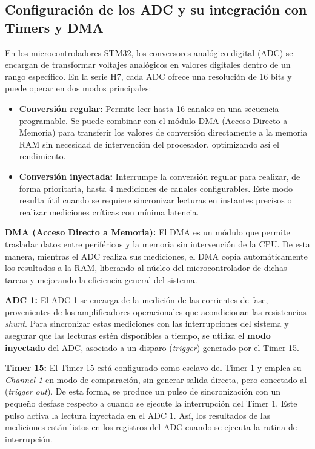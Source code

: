 \documentclass[11pt]{report}
\begin{document}
\subsection{Configuración de los ADC y su integración con Timers y DMA} En los microcontroladores STM32, los conversores analógico-digital (ADC) se encargan de transformar voltajes analógicos en valores digitales dentro de un rango específico. En la serie H7, cada ADC ofrece una resolución de 16 bits y puede operar en dos modos principales:

\begin{itemize}
	\item \textbf{Conversión regular:} Permite leer hasta 16 canales en una secuencia programable. Se puede combinar con el módulo DMA (Acceso Directo a Memoria) para transferir los valores de conversión directamente a la memoria RAM sin necesidad de intervención del procesador, optimizando así el rendimiento.
	\item \textbf{Conversión inyectada:} Interrumpe la conversión regular para realizar, de forma prioritaria, hasta 4 mediciones de canales configurables. Este modo resulta útil cuando se requiere sincronizar lecturas en instantes precisos o realizar mediciones críticas con mínima latencia.
\end{itemize}

\textbf{DMA (Acceso Directo a Memoria):} El DMA es un módulo que permite trasladar datos entre periféricos y la memoria sin intervención de la CPU. De esta manera, mientras el ADC realiza sus mediciones, el DMA copia automáticamente los resultados a la RAM, liberando al núcleo del microcontrolador de dichas tareas y mejorando la eficiencia general del sistema.

\textbf{ADC 1:} El ADC 1 se encarga de la medición de las corrientes de fase, provenientes de los amplificadores operacionales que acondicionan las resistencias \emph{shunt}. Para sincronizar estas mediciones con las interrupciones del sistema y asegurar que las lecturas estén disponibles a tiempo, se utiliza el \textbf{modo inyectado} del ADC, asociado a un disparo (\emph{trigger}) generado por el Timer 15.

\textbf{Timer 15:} El Timer 15 está configurado como esclavo del Timer 1 y emplea su \emph{Channel 1} en modo de comparación, sin generar salida directa, pero conectado al (\emph{trigger out}). De esta forma, se produce un pulso de sincronización con un pequeño desfase respecto a cuando se ejecute la interrupción del Timer 1. Este pulso activa la lectura inyectada en el ADC 1. Así, los resultados de las mediciones están listos en los registros del ADC cuando se ejecuta la rutina de interrupción.
\end{document}
